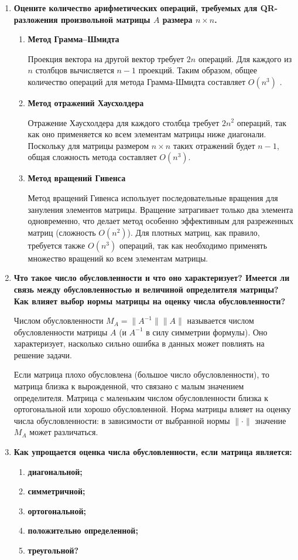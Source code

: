 \documentclass[12pt, a4paper]{article}
\begin{document}
\begin{enumerate}
	\item \textbf{Оцените количество арифметических операций, требуемых
	для QR-разложения произвольной матрицы $A$ размера $n \times n$.}
	\begin{enumerate}
		\item \textbf{ Метод Грамма--Шмидта}
		
		Проекция вектора на другой вектор требует $2n$ операций. Для каждого из $n$ столбцов вычисляется $n-1$ проекций. Таким образом, общее количество операций для метода Грамма-Шмидта составляет $O(n^3)$ .
		\item \textbf{ Метод отражений Хаусхолдера}
		
		Отражение Хаусхолдера для каждого столбца требует $2n^2$ операций, так как оно применяется ко всем элементам матрицы ниже диагонали. Поскольку для матрицы размером $n \times n$ таких отражений будет $n-1$, общая сложность метода составляет $O(n^3)$.
		\item \textbf{ Метод вращений Гивенса}
		
		Метод вращений Гивенса использует последовательные вращения для зануления элементов матрицы. Вращение затрагивает только два элемента одновременно, что делает метод особенно эффективным для разреженных матриц (сложность $O(n^2)$). Для плотных матриц, как правило, требуется также $O(n^3)$ операций, так как необходимо применять множество вращений ко всем элементам матрицы.
	\end{enumerate}



	\item \textbf{Что такое число обусловленности и что оно характеризует?
	Имеется ли связь между обусловленностью и величиной
	определителя матрицы? Как влияет выбор нормы матрицы
	на оценку числа обусловленности?}
	
		Числом обусловленности $M_{A}=\|A^{-1}\| \|A\|$ называется числом обусловленности матрицы $A$ (и $A^{-1}$ в силу симметрии формулы). Оно характеризует, насколько сильно ошибка в данных может повлиять на решение задачи.
		
		Если матрица плохо обусловлена (большое число обусловленности), то матрица близка к вырожденной, что связано с малым значением определителя.
		Матрица с маленьким числом обусловленности близка к ортогональной или хорошо обусловленной.
		Норма матрицы влияет на оценку числа обусловленности: в зависимости от выбранной нормы $\|\cdot\|$ значение $M_{A}$ может различаться.
	
	\item  \textbf{Как упрощается оценка числа обусловленности, если матрица является:}
	\begin{enumerate}
		\item \textbf{ диагональной;}
		\item \textbf{ симметричной;}
		\item \textbf{ ортогональной;}
		\item \textbf{  положительно определенной;}
		\item \textbf{ треугольной?}
	\end{enumerate}


\end{enumerate}
\end{document}
